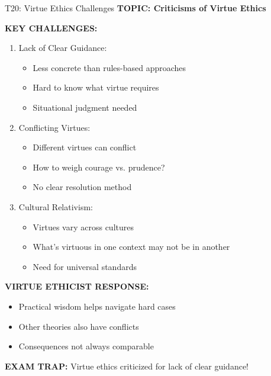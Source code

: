 \documentclass[8pt]{beamer}
\begin{document}
	\begin{frame}{T20: Virtue Ethics Challenges}
		\fontsize{6.5}{7.5}\selectfont
		\textbf{TOPIC: Criticisms of Virtue Ethics}
		
		\vspace{0.1cm}
		\textbf{KEY CHALLENGES:}
		\begin{enumerate}
			\item \textcolor{myblue}{Lack of Clear Guidance:}
			\begin{itemize}
				\item Less concrete than rules-based approaches
				\item Hard to know what virtue requires
				\item Situational judgment needed
			\end{itemize}
			\item \textcolor{myblue}{Conflicting Virtues:}
			\begin{itemize}
				\item Different virtues can conflict
				\item How to weigh courage vs. prudence?
				\item No clear resolution method
			\end{itemize}
			\item \textcolor{myblue}{Cultural Relativism:}
			\begin{itemize}
				\item Virtues vary across cultures
				\item What's virtuous in one context may not be in another
				\item Need for universal standards
			\end{itemize}
		\end{enumerate}
		
		\vspace{0.1cm}
		\textbf{VIRTUE ETHICIST RESPONSE:}
		\begin{itemize}
			\item Practical wisdom helps navigate hard cases
			\item Other theories also have conflicts
			\item Consequences not always comparable
		\end{itemize}
		
		\textcolor{myred}{\textbf{EXAM TRAP:}} Virtue ethics criticized for \textcolor{myblue}{lack of clear guidance}!
	\end{frame}
	
	
\end{document}
